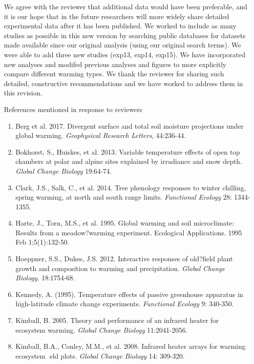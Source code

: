 \documentclass[11pt,a4paper]{letter}
\begin{document}
\begin{letter}{}
\par We agree with the reviewer that additional data would have been preferable, and it is our hope that in the future researchers will more widely share detailed experimental data after it has been published. We worked to include as many studies as possible in this new version by searching public databases for datasets made available since our original analysis (using our original search terms). We were able to add three new studies (exp13, exp14, exp15). We have incorporated new analyses and modifed previous analyses and figures to more explicitly compare different warming types. We thank the reviewer for sharing such detailed, constructive recommendations and we have worked to address them in this revision.


\noindent References mentioned in response to reviewers
\begin{footnotesize}
\begin{enumerate}
\item Berg et al. 2017. Divergent surface and total soil moisture projections under global warming. \emph{Geophysical Research Letters}, 44:236-44. 
\item Bokhorst, S., Huiskes, et al. 2013. Variable temperature effects of open top chambers at polar and alpine sites explained by irradiance and snow depth. \emph{Global Change Biology} 19:64-74.
\item Clark, J.S., Salk, C., et al. 2014. Tree phenology responses to winter chilling, spring warming, at north and south range limits. \emph{Functional Ecology} 28: 1344-1355.
\item Harte, J., Torn, M.S., et al. 1995. Global warming and soil microclimate: Results from a meadow?warming experiment. Ecological Applications. 1995 Feb 1;5(1):132-50.
\item Hoeppner, S.S., Dukes, J.S. 2012. Interactive responses of old?field plant growth and composition to warming and precipitation. \emph{Global Change Biology}. 18:1754-68.
\item Kennedy, A. (1995). Temperature effects of passive greenhouse apparatus in high-latitude climate change experiments. \emph{Functional Ecology} 9: 340-350.
\item Kimball, B. 2005. Theory and performance of an infrared heater for ecosystem warming. \emph{Global Change Biology} 11:2041-2056.
\item Kimball, B.A., Conley, M.M., et al. 2008. Infrared heater arrays for warming ecosystem eld plots. \emph{Global Change Biology} 14: 309-320.

\end{enumerate}
\end{footnotesize}
\end{letter}
\end{document}
